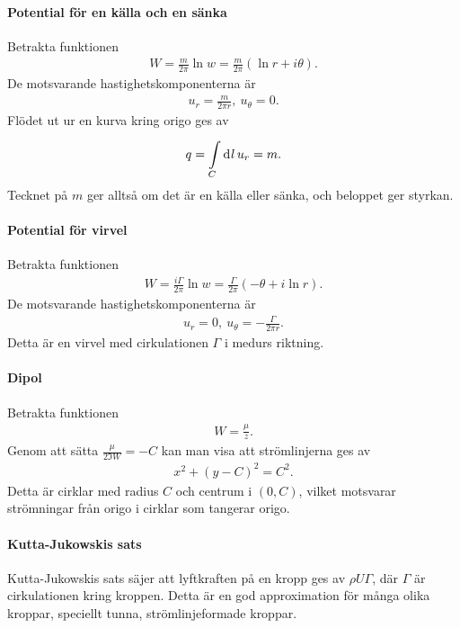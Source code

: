 \paragraph{Potential för en källa och en sänka}
Betrakta funktionen
\begin{align*}
	W = \frac{m}{2\pi}\ln{w} = \frac{m}{2\pi}(\ln{r} + i\theta).
\end{align*}
De motsvarande hastighetskomponenterna är
\begin{align*}
	u_{r} = \frac{m}{2\pi r},\ u_{\theta} = 0.
\end{align*}
Flödet ut ur en kurva kring origo ges av
\begin{align*}
	q = \int\limits_{C}^{}\dd[]{l}u_{r} = m.
\end{align*}
Tecknet på $m$ ger alltså om det är en källa eller sänka, och beloppet ger styrkan.

\paragraph{Potential för virvel}
Betrakta funktionen
\begin{align*}
	W = \frac{i\Gamma}{2\pi}\ln{w} = \frac{\Gamma}{2\pi}(-\theta + i\ln{r}).
\end{align*}
De motsvarande hastighetskomponenterna är
\begin{align*}
	u_{r} = 0,\ u_{\theta} = -\frac{\Gamma}{2\pi r}.
\end{align*}
Detta är en virvel med cirkulationen $\Gamma$ i medurs riktning.

\paragraph{Dipol}
Betrakta funktionen
\begin{align*}
	W = \frac{\mu}{z}.
\end{align*}
Genom att sätta $\frac{\mu}{2\Im{W}} = -C$ kan man visa att strömlinjerna ges av
\begin{align*}
	x^{2} + (y - C)^{2} = C^{2}.
\end{align*}
Detta är cirklar med radius $C$ och centrum i $(0, C)$, vilket motsvarar strömningar från origo i cirklar som tangerar origo.

\paragraph{Kutta-Jukowskis sats}
Kutta-Jukowskis sats säjer att lyftkraften på en kropp ges av $\rho U\Gamma$, där $\Gamma$ är cirkulationen kring kroppen. Detta är en god approximation för många olika kroppar, speciellt tunna, strömlinjeformade kroppar.